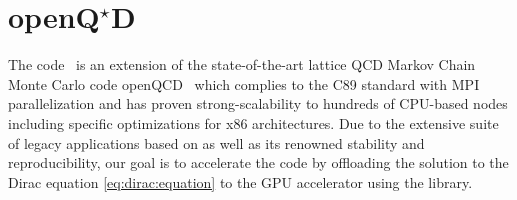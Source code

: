 \chapter{\texorpdfstring{openQ$^\star$D}{openQxD}}
\label{ch:p1:openqxd}




The \openqxd code~\cite{openqxd} is an extension of the state-of-the-art lattice QCD Markov Chain Monte Carlo code openQCD~\cite{online:openqcd,Luscher:2012av} which complies to the C89 standard with MPI parallelization and has proven strong-scalability to hundreds of CPU-based nodes including specific optimizations for x86 architectures.
Due to the extensive suite of legacy applications based on \openqcd as well as its renowned stability and reproducibility, our goal is to accelerate the code by offloading the solution to the Dirac equation \cref{eq:dirac:equation} to the GPU accelerator using the \quda library.



